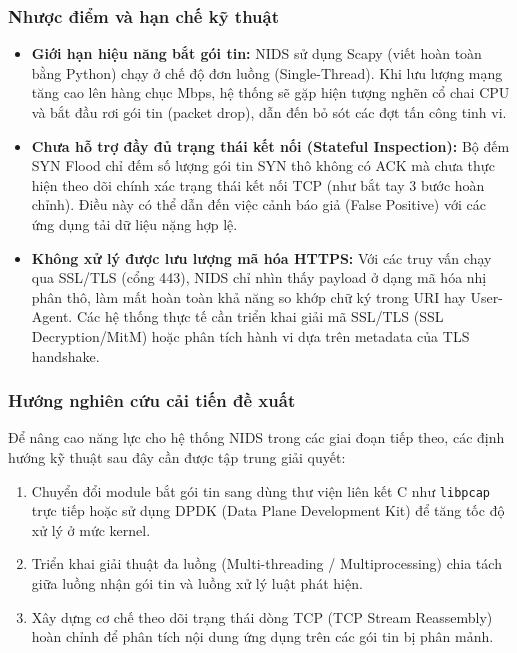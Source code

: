 \subsubsection{Nhược điểm và hạn chế kỹ thuật}
\begin{itemize}
    \item \textbf{Giới hạn hiệu năng bắt gói tin:} NIDS sử dụng Scapy (viết hoàn toàn bằng Python) chạy ở chế độ đơn luồng (Single-Thread). Khi lưu lượng mạng tăng cao lên hàng chục Mbps, hệ thống sẽ gặp hiện tượng nghẽn cổ chai CPU và bắt đầu rơi gói tin (packet drop), dẫn đến bỏ sót các đợt tấn công tinh vi.
    \item \textbf{Chưa hỗ trợ đầy đủ trạng thái kết nối (Stateful Inspection):} Bộ đếm SYN Flood chỉ đếm số lượng gói tin SYN thô không có ACK mà chưa thực hiện theo dõi chính xác trạng thái kết nối TCP (như bắt tay 3 bước hoàn chỉnh). Điều này có thể dẫn đến việc cảnh báo giả (False Positive) với các ứng dụng tải dữ liệu nặng hợp lệ.
    \item \textbf{Không xử lý được lưu lượng mã hóa HTTPS:} Với các truy vấn chạy qua SSL/TLS (cổng 443), NIDS chỉ nhìn thấy payload ở dạng mã hóa nhị phân thô, làm mất hoàn toàn khả năng so khớp chữ ký trong URI hay User-Agent. Các hệ thống thực tế cần triển khai giải mã SSL/TLS (SSL Decryption/MitM) hoặc phân tích hành vi dựa trên metadata của TLS handshake.
\end{itemize}

\subsubsection{Hướng nghiên cứu cải tiến đề xuất}
Để nâng cao năng lực cho hệ thống NIDS trong các giai đoạn tiếp theo, các định hướng kỹ thuật sau đây cần được tập trung giải quyết:
\begin{enumerate}
    \item Chuyển đổi module bắt gói tin sang dùng thư viện liên kết C như \texttt{libpcap} trực tiếp hoặc sử dụng DPDK (Data Plane Development Kit) để tăng tốc độ xử lý ở mức kernel.
    \item Triển khai giải thuật đa luồng (Multi-threading / Multiprocessing) chia tách giữa luồng nhận gói tin và luồng xử lý luật phát hiện.
    \item Xây dựng cơ chế theo dõi trạng thái dòng TCP (TCP Stream Reassembly) hoàn chỉnh để phân tích nội dung ứng dụng trên các gói tin bị phân mảnh.
\end{enumerate}

